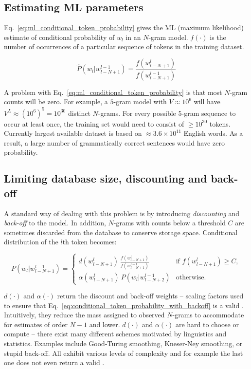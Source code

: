 \documentclass{IIBproject}
\makeatletter
\DeclareRobustCommand*{\AbbreviationWithDot}[1]{\@ifnextchar{.}{#1}{#1.\@\xspace}}
\DeclareRobustCommand*{\pmf}{\AbbreviationWithDot{p.m.f}}
\makeatother
\begin{document}
\subsection{Estimating ML parameters}

Eq.~\ref{eq:ml_conditional_token_probability} gives the ML (maximum likelihood) estimate of conditional probability of $w_l$ in an $N$-gram model. $f(\cdot)$ is the number of occurrences of a particular sequence of tokens in the training dataset.

\begin{equation}
\label{eq:ml_conditional_token_probability}
\hat P( w_l | w_{l-N+1}^{l-1} ) = \frac {f(w_{l-N+1}^l)} {f(w_{l-N+1}^{l-1})}
\end{equation}

A problem with Eq.~\ref{eq:ml_conditional_token_probability} is that most $N$-gram counts will be zero. For example, a $5$-gram model with $V \approx 10^6$ will have $V^L \approx \left( 10^6 \right)^5 = 10^{30}$ distinct $N$-grams. For every possible $5$-gram sequence to occur at least once, the training set would need to consist of $\ge 10^{30}$ tokens. Currently largest available dataset is based on $\approx 3.6 \times 10^{11}$ English words. \cite{googlengrams2011} As a result, a large number of grammatically correct sentences would have zero probability.

\subsection{Limiting database size, discounting and back-off}

A standard way of dealing with this problem is by introducing \emph{discounting} and \emph{back-off} to the model. In addition, $N$-grams with counts below a threshold $C$ are sometimes discarded from the database to conserve storage space. Conditional distribution of the $l$th token becomes:

\begin{equation}
	\label{eq:conditional_token_probability_with_backoff}
	P( w_l | w_{l-N+1}^{l-1} ) =
	\begin{cases}
		d (w_{l-N+1}^l) ~ \frac {f\left(w_{l-N+1}^l \right)} {f\left(w_{l-N+1}^{l-1} \right)} & \text{if $f(w_{l-N+1}^l) \ge C$},\\
		\alpha (w_{l-N+1}^l) ~ P( w_l | w_{l-N+2}^{l-1} ) & \text{otherwise}.
	\end{cases}
\end{equation}

$d(\cdot)$ and $\alpha(\cdot)$ return the discount and back-off weights -- scaling factors used to ensure that Eq.~\ref{eq:conditional_token_probability_with_backoff} is a valid \pmf. Intuitively, they reduce the mass assigned to observed $N$-grams to accommodate for estimates of order $N-1$ and lower. $d(\cdot)$ and $\alpha(\cdot)$ are hard to choose or compute -- there exist many different schemes motivated by linguistics and statistics. Examples include Good-Turing smoothing,\cite{good1953} Kneser-Ney smoothing,\cite{kneserney1995} or stupid back-off.\cite{brants2007} All exhibit various levels of complexity and for example the last one does not even return a valid \pmf.
\end{document}
